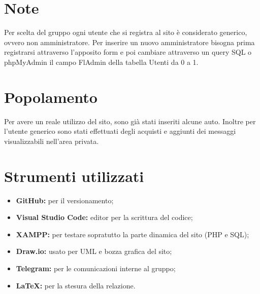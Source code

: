 \appendix
    \section{Note}
    Per scelta del gruppo ogni utente che si registra al sito è considerato generico, ovvero non amministratore. Per inserire un nuovo amministratore bisogna prima registrarsi attraverso l'apposito form e poi cambiare attraverso un query SQL o phpMyAdmin il campo FlAdmin della tabella Utenti da 0 a 1.

    \section{Popolamento}
    Per avere un reale utilizzo del sito, sono già stati inseriti alcune auto. Inoltre per l'utente generico sono stati effettuati degli acquisti e aggiunti dei messaggi visualizzabili nell'area privata.

    \section{Strumenti utilizzati}
    \begin{itemize}
        \item \textbf{GitHub:} per il versionamento; 
        \item \textbf{Visual Studio Code:} editor per la scrittura del codice; 
        \item \textbf{XAMPP:} per testare sopratutto la parte dinamica del sito (PHP e SQL);
        \item \textbf{Draw.io:} usato per UML e bozza grafica del sito;
        \item \textbf{Telegram:} per le comunicazioni interne al gruppo;
        \item \textbf{\LaTeX:} per la stesura della relazione.
    \end{itemize}
\pagebreak